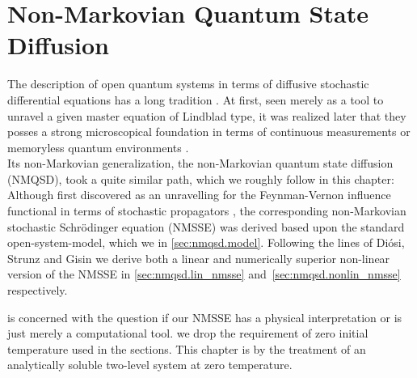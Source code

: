 \chapter{Non-Markovian Quantum State Diffusion}
\label{chap:nmqsd}
%

The description of open quantum systems in terms of diffusive stochastic differential equations has a long tradition \cite{}.
At first, seen merely as a tool to unravel a given master equation of Lindblad type, it was realized later that they posses a strong microscopical foundation in terms of continuous measurements or memoryless quantum environments \cite{}.\\




Its non-Markovian generalization, the non-Markovian quantum state diffusion (NMQSD), took a quite similar path, which we roughly follow in this chapter:
Although first discovered as an unravelling for the Feynman-Vernon influence functional in terms of stochastic propagators \cite{St96_lin_nmqsd}, the corresponding non-Markovian stochastic Schrödinger equation (NMSSE) was derived based upon the standard open-system-model, which we  in \autoref{sec:nmqsd.model}.
Following the lines of Diósi, Strunz and Gisin \cite{DiSt97_nmsse,DiGiSt98_nmqsd,StDiGi99_nmq_traj} we derive both a linear and numerically superior non-linear version of the NMSSE in \autoref{sec:nmqsd.lin_nmsse} and~\ref{sec:nmqsd.nonlin_nmsse} respectively.

%

 is concerned with the question if our NMSSE has a physical interpretation or is just merely a computational tool.
 we drop the requirement of zero initial temperature used in the  sections.
This chapter is  by the treatment of an analytically soluble two-level system at zero temperature.\\

